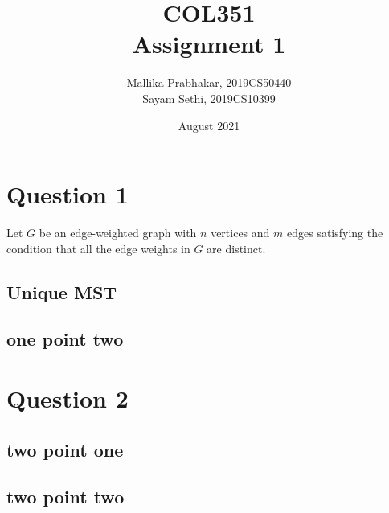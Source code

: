 \documentclass[12pt]{article}
\title{COL351 \\ Assignment 1}
\author{Mallika Prabhakar, 2019CS50440 \\ Sayam Sethi, 2019CS10399}
\date{August 2021}
\begin{document}

\maketitle
\tableofcontents
{}


\section{Question 1}

Let $G$ be an edge-weighted graph with $n$ vertices and $m$ edges satisfying the condition that all the edge weights in $G$ are distinct.

\subsection{Unique MST}



\subsection{one point two}


\section{Question 2}


\subsection{two point one}


\subsection{two point two}
\end{document}
